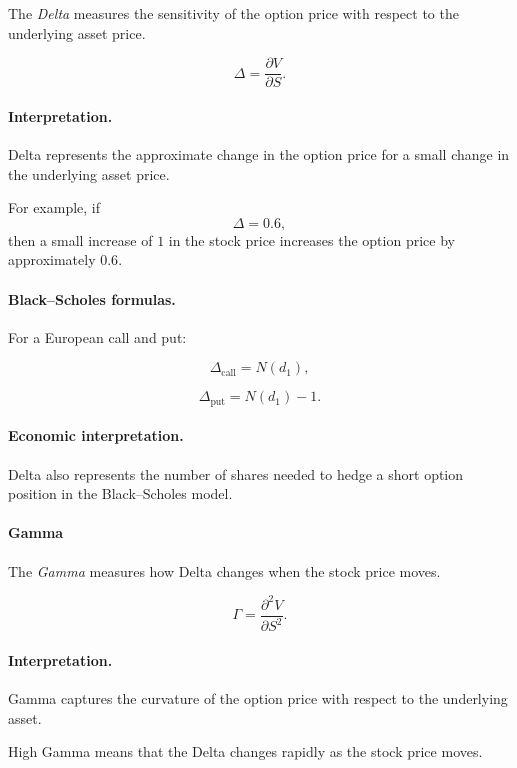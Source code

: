\documentclass[11pt]{article}
\newcommand{\1}{\mathbf{1}}
\theoremstyle{plain}
\theoremstyle{definition}
\theoremstyle{remark}
\begin{document}
The \emph{Delta} measures the sensitivity of the option price with
respect to the underlying asset price.

\[
\Delta = \frac{\partial V}{\partial S}.
\]

\paragraph{Interpretation.}

Delta represents the approximate change in the option price for a small
change in the underlying asset price.

For example, if
\[
\Delta = 0.6,
\]
then a small increase of \(1\) in the stock price increases the option
price by approximately \(0.6\).

\paragraph{Black--Scholes formulas.}

For a European call and put:

\[
\Delta_{\text{call}} = N(d_1),
\]

\[
\Delta_{\text{put}} = N(d_1)-1.
\]

\paragraph{Economic interpretation.}

Delta also represents the number of shares needed to hedge a short
option position in the Black--Scholes model.

\paragraph{Gamma}

The \emph{Gamma} measures how Delta changes when the stock price moves.

\[
\Gamma = \frac{\partial^2 V}{\partial S^2}.
\]

\paragraph{Interpretation.}

Gamma captures the curvature of the option price with respect to the
underlying asset.

High Gamma means that the Delta changes rapidly as the stock price moves.
\end{document}
